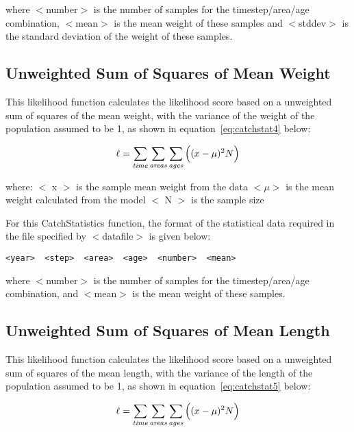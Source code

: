 \documentclass [a4paper, 10pt]{book}
\begin{document}
where $<$number$>$ is the number of samples for the timestep/area/age combination, $<$mean$>$ is the mean weight of these samples and $<$stddev$>$ is the standard deviation of the weight of these samples.

\subsection{Unweighted Sum of Squares of Mean Weight}
This likelihood function calculates the likelihood score based on a unweighted sum of squares of the mean weight, with the variance of the weight of the population assumed to be 1, as shown in equation~\ref{eq:catchstat4} below:

\begin{equation}\label{eq:catchstat4}
\ell = \sum_{\it time}\sum_{\it areas}\sum_{\it ages} \Big((x-\mu)^2 N\Big)
\end{equation}

where:\newline
$<$ x $>$ is the sample mean weight from the data\newline
$<\mu>$ is the mean weight calculated from the model\newline
$<$ N $>$ is the sample size

\bigskip
For this CatchStatistics function, the format of the statistical data required in the file specified by $<$datafile$>$ is given below:

{\small\begin{verbatim}
<year>  <step>  <area>  <age>  <number>  <mean>
\end{verbatim}}

where $<$number$>$ is the number of samples for the timestep/area/age combination, and $<$mean$>$ is the mean weight of these samples.

\subsection{Unweighted Sum of Squares of Mean Length}
This likelihood function calculates the likelihood score based on a unweighted sum of squares of the mean length, with the variance of the length of the population assumed to be 1, as shown in equation~\ref{eq:catchstat5} below:

\begin{equation}\label{eq:catchstat5}
\ell = \sum_{\it time}\sum_{\it areas}\sum_{\it ages} \Big((x-\mu)^2 N\Big)
\end{equation}
\end{document}
